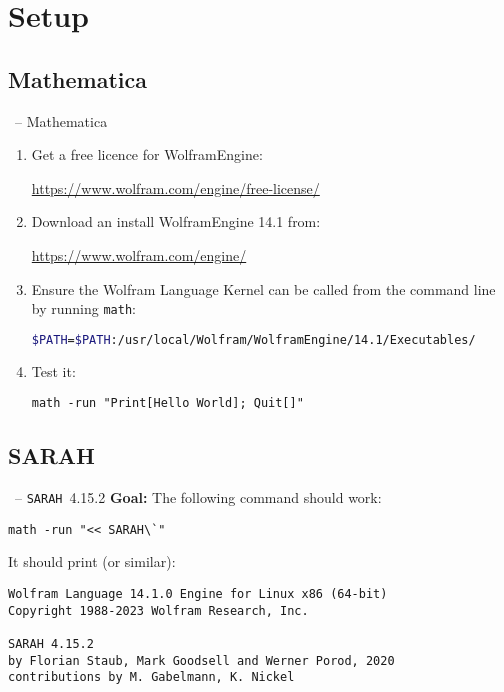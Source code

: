\documentclass[11pt]{beamer}
\newcommand{\SARAH}{\texttt{SARAH}}
\begin{document}

\section{Setup}
\subsection{Mathematica}

\begin{frame}[fragile]{\insertsection\ -- Mathematica}
  \begin{enumerate}
  \item Get a free licence for WolframEngine:
    \begin{center}
      \url{https://www.wolfram.com/engine/free-license/}
    \end{center}
  \item Download an install WolframEngine 14.1 from:
    \begin{center}
      \url{https://www.wolfram.com/engine/}
    \end{center}
  \item Ensure the Wolfram Language Kernel can be called from the
    command line by running \texttt{math}:
    \begin{lstlisting}[language=sh]
$PATH=$PATH:/usr/local/Wolfram/WolframEngine/14.1/Executables/\end{lstlisting}
  \item Test it:
    \begin{lstlisting}
math -run "Print[Hello World]; Quit[]"\end{lstlisting}
  \end{enumerate}
\end{frame}


\subsection{SARAH}

\begin{frame}[fragile]{\insertsection\ -- \SARAH\ 4.15.2}
  \textbf{Goal:} The following command should work:
  \begin{lstlisting}
math -run "<< SARAH\`"\end{lstlisting}
  It should print (or similar):
  \begin{lstlisting}[basicstyle=\scriptsize\ttfamily]
Wolfram Language 14.1.0 Engine for Linux x86 (64-bit)
Copyright 1988-2023 Wolfram Research, Inc.

SARAH 4.15.2
by Florian Staub, Mark Goodsell and Werner Porod, 2020
contributions by M. Gabelmann, K. Nickel\end{lstlisting}
\end{frame}
\end{document}
